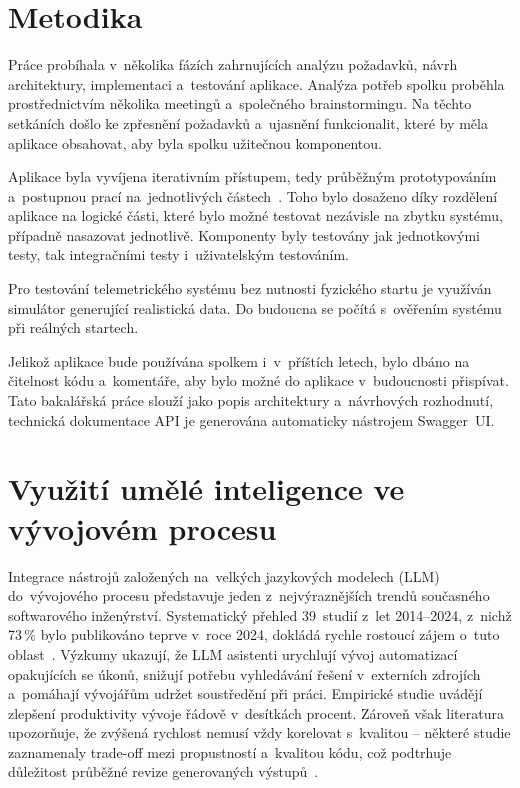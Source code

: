 \section{Metodika}
Práce probíhala v~několika fázích zahrnujících analýzu požadavků, návrh architektury, implementaci a~testování aplikace.
Analýza potřeb spolku proběhla prostřednictvím několika meetingů a~společného brainstormingu. Na těchto setkáních došlo ke zpřesnění požadavků a~ujasnění funkcionalit, které by měla aplikace obsahovat, aby byla spolku užitečnou komponentou.

Aplikace byla vyvíjena iterativním přístupem, tedy průběžným prototypováním a~postupnou prací na~jednotlivých částech~\cite{nolle2020waterfall}. Toho bylo dosaženo díky rozdělení aplikace na logické části, které bylo možné testovat nezávisle na zbytku systému, případně nasazovat jednotlivě.
Komponenty byly testovány jak jednotkovými testy, tak integračními testy i~uživatelským testováním.

Pro testování telemetrického systému bez nutnosti fyzického startu je využíván simulátor generující realistická data. Do budoucna se počítá s~ověřením systému při reálných startech.

Jelikož aplikace bude používána spolkem i~v~příštích letech, bylo dbáno na čitelnost kódu a~komentáře, aby bylo možné do aplikace v~budoucnosti přispívat. Tato bakalářská práce slouží jako popis architektury a~návrhových rozhodnutí, technická dokumentace API je generována automaticky nástrojem Swagger~UI.

\section{Využití umělé inteligence ve vývojovém procesu}
Integrace nástrojů založených na~velkých jazykových modelech (LLM) do~vývojového procesu představuje jeden z~nejvýraznějších trendů současného softwarového inženýrství. Systematický přehled 39~studií z~let 2014--2024, z~nichž 73\,\% bylo publikováno teprve v~roce 2024, dokládá rychle rostoucí zájem o~tuto oblast~\cite{mohamed2025llmproductivity}. Výzkumy ukazují, že LLM asistenti urychlují vývoj automatizací opakujících se úkonů, snižují potřebu vyhledávání řešení v~externích zdrojích a~pomáhají vývojářům udržet soustředění při práci. Empirické studie uvádějí zlepšení produktivity vývoje řádově v~desítkách procent. Zároveň však literatura upozorňuje, že zvýšená rychlost nemusí vždy korelovat s~kvalitou -- některé studie zaznamenaly trade-off mezi propustností a~kvalitou kódu, což podtrhuje důležitost průběžné revize generovaných výstupů~\cite{mohamed2025llmproductivity}.

